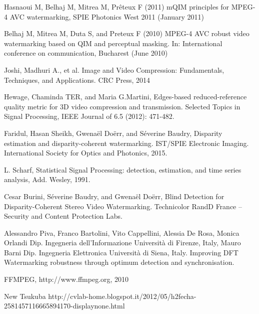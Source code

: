 \begin{thebibliography}{99}
Hasnaoui M, Belhaj M, Mitrea M, Prêteux F (2011) mQIM principles for MPEG-4 AVC watermarking, SPIE Photonics West 2011 (January 2011)

Belhaj M, Mitrea M, Duta S, and Preteux F (2010) MPEG-4 AVC robust video watermarking based on QIM and perceptual masking. In: International conference on communication, Bucharest (June 2010)

Joshi, Madhuri A., et al. Image and Video Compression: Fundamentals, Techniques, and Applications. CRC Press, 2014

 Hewage, Chaminda TER, and Maria G.Martini, Edges-based reduced-reference quality metric for 3D video compression and transmission. Selected Topics in Signal Processing, IEEE Journal of 6.5 (2012): 471-482.



Faridul, Hasan Sheikh, Gwenaël Doërr, and Séverine Baudry, Disparity estimation and disparity-coherent watermarking. IST/SPIE Electronic Imaging. International Society for Optics and Photonics, 2015.


L. Scharf, Statistical Signal Processing: detection,
estimation, and time series analysis, Add. Wesley,
1991.


Cesar Burini, Séverine Baudry, and Gwenaël Doërr, Blind Detection for Disparity-Coherent Stereo Video Watermarking. Technicolor RandD France – Security and Content Protection Labs.

Alessandro Piva, Franco Bartolini, Vito Cappellini, Alessia De Rosa, Monica Orlandi Dip. Ingegneria dell’Informazione Università di Firenze, Italy,  Mauro Barni Dip. Ingegneria Elettronica Università di Siena, Italy. Improving DFT Watermarking robustness through optimum detection and synchronisation.

 FFMPEG, http://www.ffmpeg.org, 2010

New Tsukuba http://cvlab-home.blogspot.it/2012/05/h2fecha-2581457116665894170-displaynone.html



\end{thebibliography}
\clearpage
\thispagestyle{empty}